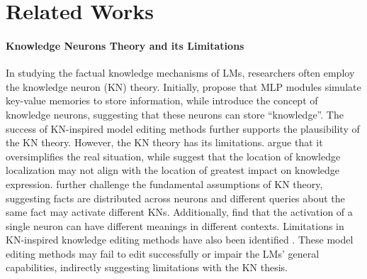 \section{Related Works}
\paragraph{Knowledge Neurons Theory and its Limitations}
In studying the factual knowledge mechanisms of LMs, researchers often employ the knowledge neuron (KN) theory. Initially, \citet{geva-etal-2021-transformer} propose that MLP modules simulate key-value memories to store information, while \citet{dai2022knowledge} introduce the concept of knowledge neurons, suggesting that these neurons can store ``knowledge''. The success of KN-inspired model editing methods \citep{meng2022locating, meng2023massediting} further supports the plausibility of the KN theory. However, the KN theory has its limitations. \citet{niu2024what} argue that it oversimplifies the real situation, while \citet{hase2023does} suggest that the location of knowledge localization may not align with the location of greatest impact on knowledge expression. 
\citet{chen2024knowledgelocalizationmissionaccomplished} further challenge the fundamental assumptions of KN theory, suggesting facts are distributed across neurons and different queries about the same fact may activate different KNs.
Additionally, \citet{bricken2023monosemanticity} find that the activation of a single neuron can have different meanings in different contexts.
Limitations in KN-inspired knowledge editing methods have also been identified \citep{li2024unveiling, yao-etal-2023-editing, cohen2024evaluating, hoelscher2023detecting, pinter2023emptying, zhao2023unveiling}. These model editing methods may fail to edit successfully or impair the LMs' general capabilities, indirectly suggesting limitations with the KN thesis.
